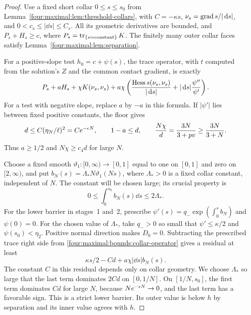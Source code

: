\begin{proof}
Use a fixed short collar $0\le s\le s_0$ from
Lemma~\ref{four:maximal:lem:threshold-collars}, with $C=-\kappa s$,
$\nu_s=\operatorname{grad} s/|\,\mathrm d s|$, and $0<c_s\le|\dd s|\le C_s$.
All its geometric derivatives are bounded, and
$P_s+H_s\ge c$, where $P_s=\operatorname{tr}_{\{s=\mathrm{constant}\}}K$.
The finitely many outer collar faces satisfy
Lemma~\ref{four:maximal:lem:separation}.

For a positive-slope test $h_0=c+\psi(s)$, the trace operator, with
$t$ computed from the solution's $Z$ and the common contact gradient,
is exactly
\begin{equation}\label{four:maximal:bounds:collar-operator}
 P_s+aH_s+\chi K(\nu_s,\nu_s)
 +a\chi\left(
    \frac{\operatorname{Hess} s(\nu_s,\nu_s)}{|\,\mathrm d s|}
       +|\,\mathrm d s|\frac{\psi''}{\psi'}\right).
\end{equation}
For a test with negative slope, replace $a$ by $-a$ in this formula.
If $|\psi'|$ lies between fixed positive constants, the floor gives
\begin{equation}\label{four:maximal:bounds:steep-coefficients}
 d\le C(\eta_N/\ell)^2=Ce^{-\epsilon N},\qquad
 1-a\le d,\qquad
 \frac{N\chi}{d}=\frac{3N}{3+pv}\ge\frac{3N}{3+N}.
\end{equation}
Thus $a\ge1/2$ and $N\chi\ge c_4d$ for large $N$.

Choose a fixed smooth $\vartheta_1:[0,\infty)\to[0,1]$ equal to one
on $[0,1]$ and zero on $[2,\infty)$, and put
$b_N(s)=\Lambda_* N\vartheta_1(Ns)$, where $\Lambda_*>0$ is a fixed collar
constant, independent of $N$. The constant will be
chosen large; its crucial property is
\[
 0\le\int_0^{s_0}b_N(s)\dd s\le2\Lambda_*.
\]
For the lower barrier in stages~1 and~2, prescribe
$\psi'(s)=q_-\exp(\int_0^s b_N)$ and $\psi(0)=0$.
For the chosen value of $\Lambda_*$, take $q_->0$ so small that $\psi'\le\kappa/2$ and
$\psi(s_0)<\eta_2$. Positive normal direction makes $D_0=0$.
Subtracting the prescribed trace right side from
\eqref{four:maximal:bounds:collar-operator} gives a residual at least
\begin{equation}\label{four:maximal:bounds:lower-residual}
 \kappa s/2-Cd+a\chi|\dd s|b_N(s).
\end{equation}
The constant $C$ in this residual depends only on collar geometry.
We choose $\Lambda_*$ so large that the last term dominates $2Cd$ on
$[0,1/N]$. On $[1/N,s_0]$, the first term dominates $Cd$ for large
$N$, because $Ne^{-\epsilon N}\to0$, and the last term has a favorable
sign. This is a strict lower barrier. Its outer value is below $h$
by separation and its inner value agrees with $h$.


\end{proof}
